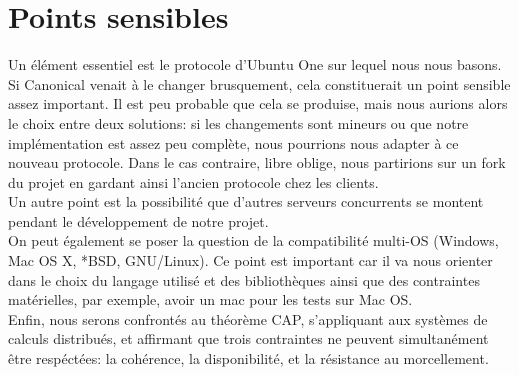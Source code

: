 \section{Points sensibles}
Un élément essentiel est le protocole d'Ubuntu One sur lequel nous nous basons. Si Canonical venait à le changer brusquement, cela constituerait un point sensible assez important. Il est peu probable que cela se produise, mais nous aurions alors le choix entre deux solutions: si les changements sont mineurs ou que notre implémentation est assez peu complète, nous pourrions nous adapter à ce nouveau protocole. Dans le cas contraire, libre oblige, nous partirions sur un fork du projet en gardant ainsi l'ancien protocole chez les clients.\\

Un autre point est la possibilité que d'autres serveurs concurrents se montent pendant le développement de notre projet.\\

On peut également se poser la question de la compatibilité multi-OS (Windows, Mac OS X, *BSD, GNU/Linux). Ce point est important car il va nous orienter dans le choix du langage utilisé et des bibliothèques ainsi que des contraintes matérielles, par exemple, avoir un mac pour les tests sur Mac OS.\\

Enfin, nous serons confrontés au théorème CAP, s'appliquant aux systèmes de calculs distribués, et affirmant que trois contraintes ne peuvent simultanément être respéctées: la cohérence, la disponibilité, et la résistance au morcellement.

